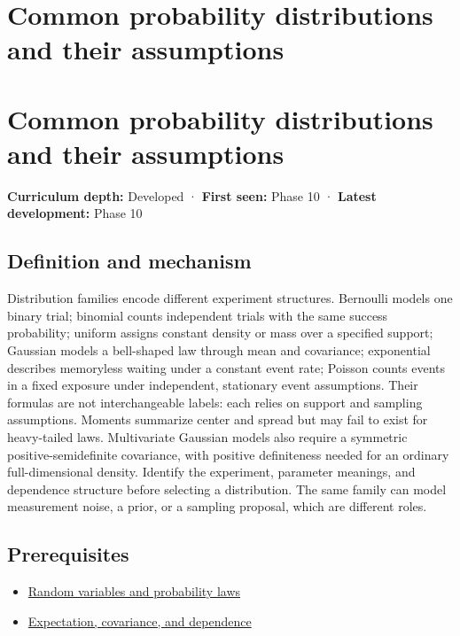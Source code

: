 \hypertarget{appendix-a2360b435383}{}
\section*{Common probability distributions and their assumptions}
\section{Common probability distributions and their assumptions}\label{common-probability-distributions-and-their-assumptions}

\textbf{Curriculum depth:} Developed · \textbf{First seen:} Phase 10 · \textbf{Latest development:} Phase 10

\subsection{Definition and mechanism}\label{definition-and-mechanism}

Distribution families encode different experiment structures. Bernoulli models one binary trial; binomial counts independent trials with the same success probability; uniform assigns constant density or mass over a specified support; Gaussian models a bell-shaped law through mean and covariance; exponential describes memoryless waiting under a constant event rate; Poisson counts events in a fixed exposure under independent, stationary event assumptions. Their formulas are not interchangeable labels: each relies on support and sampling assumptions. Moments summarize center and spread but may fail to exist for heavy-tailed laws. Multivariate Gaussian models also require a symmetric positive-semidefinite covariance, with positive definiteness needed for an ordinary full-dimensional density. Identify the experiment, parameter meanings, and dependence structure before selecting a distribution. The same family can model measurement noise, a prior, or a sampling proposal, which are different roles.

\subsection{Prerequisites}\label{prerequisites}

\begin{itemize}
\tightlist
\item
  \hyperref[appendix-4d0203f7944f]{Random variables and probability laws}
\item
  \hyperref[appendix-54c383df9992]{Expectation, covariance, and dependence}
\end{itemize}

